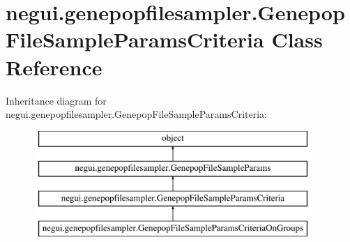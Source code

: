 \hypertarget{classnegui_1_1genepopfilesampler_1_1GenepopFileSampleParamsCriteria}{}\section{negui.\+genepopfilesampler.\+Genepop\+File\+Sample\+Params\+Criteria Class Reference}
\label{classnegui_1_1genepopfilesampler_1_1GenepopFileSampleParamsCriteria}
Inheritance diagram for negui.\+genepopfilesampler.\+Genepop\+File\+Sample\+Params\+Criteria\+:\begin{figure}[H]
\begin{center}
\leavevmode
\includegraphics[height=4.000000cm]{classnegui_1_1genepopfilesampler_1_1GenepopFileSampleParamsCriteria}
\end{center}
\end{figure}
